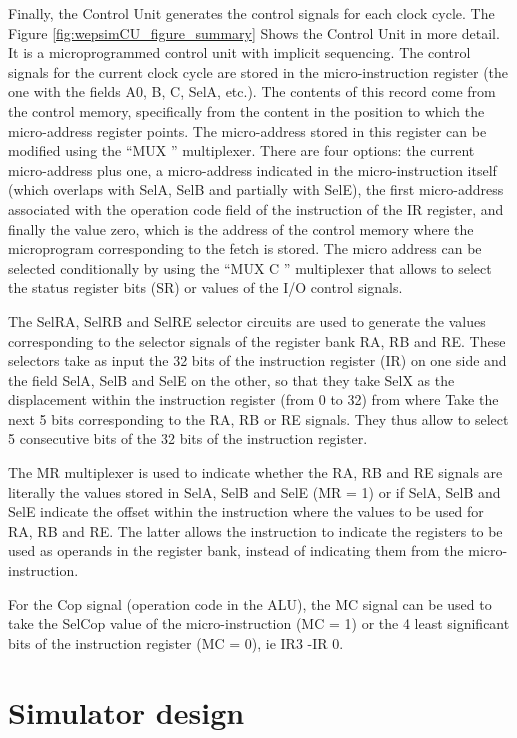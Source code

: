 Finally, the Control Unit generates the control signals for each clock cycle. The Figure \ref{fig:wepsimCU_figure_summary} Shows the Control Unit in more detail. It is a microprogrammed control unit with implicit sequencing. The control signals for the current clock cycle are stored in the micro-instruction register (the one with the fields A0, B, C, SelA, etc.). The contents of this record come from the control memory, specifically from the content in the position to which the micro-address register points. The micro-address stored in this register can be modified using the ``MUX '' multiplexer. There are four options: the current micro-address plus one, a micro-address indicated in the micro-instruction itself (which overlaps with SelA, SelB and partially with SelE), the first micro-address associated with the operation code field of the instruction of the IR register, and finally the value zero, which is the address of the control memory where the microprogram corresponding to the fetch is stored. The micro address can be selected conditionally by using the ``MUX C '' multiplexer that allows to select the status register bits (SR) or values of the I/O control signals. 

The SelRA, SelRB and SelRE selector circuits are used to generate the values corresponding to the selector signals of the register bank RA, RB and RE. These selectors take as input the 32 bits of the instruction register (IR) on one side and the field SelA, SelB and SelE on the other, so that they take SelX as the displacement within the instruction register (from 0 to 32) from where Take the next 5 bits corresponding to the RA, RB or RE signals. They thus allow to select 5 consecutive bits of the 32 bits of the instruction register.

The MR multiplexer is used to indicate whether the RA, RB and RE signals are literally the values stored in SelA, SelB and SelE (MR = 1) or if SelA, SelB and SelE indicate the offset within the instruction where the values to be used for RA, RB and RE. The latter allows the instruction to indicate the registers to be used as operands in the register bank, instead of indicating them from the micro-instruction.

For the Cop signal (operation code in the ALU), the MC signal can be used to take the SelCop value of the micro-instruction (MC = 1) or the 4 least significant bits of the instruction register (MC = 0), ie IR3 -IR 0.

\section{Simulator design}

